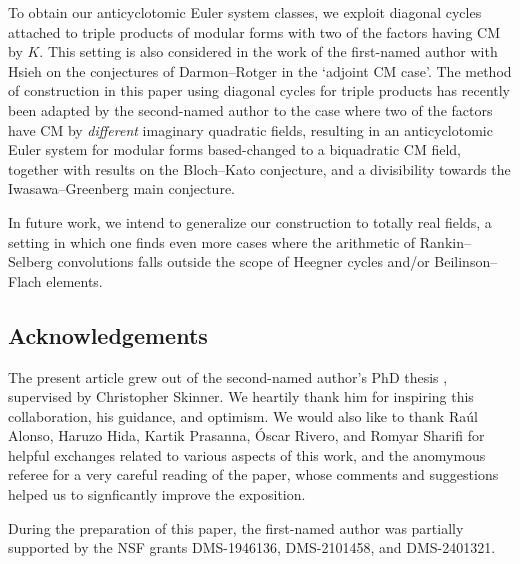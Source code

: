 \documentclass[10pt,letterpaper]{amsart}
\theoremstyle{plain}
\theoremstyle{definition}
\theoremstyle{definition}
\theoremstyle{plain}
\theoremstyle{plain}
\theoremstyle{plain}
\theoremstyle{remark}
\numberwithin{equation}{section}
\begin{document}
{\vspace{5pt}

To obtain our anticyclotomic Euler system classes, we exploit   diagonal cycles attached to triple products of modular forms with two of the factors having CM by $K$. This setting is also  considered in the work of the first-named author with Hsieh \cite{cas-hsieh-ord} on the conjectures of Darmon--Rotger \cite{DR2.5} in the `adjoint CM case'.   
The method of construction in this paper using diagonal cycles for triple products has recently been adapted by the second-named author \cite{Do-biquadratic} to the case where two of the factors have CM by \emph{different} imaginary quadratic fields, 
resulting in an anticyclotomic Euler system for modular forms based-changed to a biquadratic CM field, together with results on the Bloch--Kato conjecture, and a divisibility towards the Iwasawa--Greenberg main conjecture. %


In future work, %
we intend to generalize our construction to totally real fields, a setting in which one finds even more cases where the arithmetic of Rankin--Selberg convolutions falls outside the scope of Heegner cycles and/or Beilinson--Flach elements. 



\subsection{Acknowledgements} 
The present article grew out of the second-named author's PhD thesis \cite{Do-PhD}, supervised by Christopher Skinner. We heartily thank him for inspiring this collaboration, his guidance,  and optimism. We would also like to thank Ra\'{u}l Alonso, Haruzo Hida, Kartik Prasanna, \'Oscar Rivero, and Romyar Sharifi for helpful exchanges related to various aspects of this work, and the anomymous referee for a very careful reading of the paper,  whose comments and suggestions helped us to signficantly improve the exposition. 

During the preparation of this paper, the first-named author was partially supported by the NSF grants DMS-1946136, DMS-2101458, and DMS-2401321.






}
\end{document}
